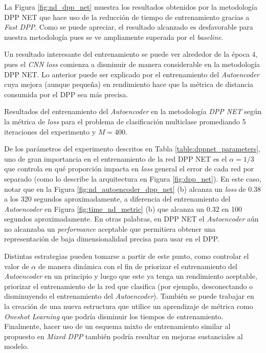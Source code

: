 La Figura \ref{fig:nd_dpp_net} muestra los resultados obtenidos por la metodología DPP NET que hace uso de la reducción de tiempo de entrenamiento gracias a \textit{Fast DPP}. Como se puede apreciar, el resultado alcanzado es desfavorable para nuestra metodología pues se ve ampliamente superada por el \textit{baseline}. 

\vspace{0.2cm}

Un resultado interesante del entrenamiento se puede ver alrededor de la época 4, pues el \textit{CNN loss} comienza a disminuir de manera considerable en la metodología DPP NET. Lo anterior puede ser explicado por el entrenamiento del \textit{Autoencoder} cuya mejora (aunque pequeña) en rendimiento hace que la métrica de distancia consumida por el DPP sea más precisa. 

\begin{images}[\label{fig:nd_autoencoder_dpp_net}]{\centering Resultados del entrenamiento del \textit{Autoencoder} en la metodología \textit{DPP NET} según la métrica de \textit{loss} para el problema de clasificación multiclase promediando 5 iteraciones del experimento y $M=400$.}
\end{images}

De los parámetros del experimento descritos en Tabla \ref{table:dppnet_parameters}, uno de gran importancia en el entrenamiento de la red DPP NET es el $\alpha = 1/3$ que controla en qué proporción impacta en \textit{loss} general el error de cada red por separado (como lo describe la arquitectura en Figura \ref{fig:dpp_net}). En este caso, notar que en la Figura \ref{fig:nd_autoencoder_dpp_net} (b) alcanza un \textit{loss} de 0.38 a los 320 segundos aproximadamente, a diferencia del entrenamiento del \textit{Autoencoder} en Figura \ref{fig:time_nd_metric} (b) que alcanza un 0.32 en 100 segundos aproximadamente. En otras palabras, en DPP NET el \textit{Autoencoder} aún no alcanzaba un \textit{performance} aceptable que permitiera obtener una representación de baja dimensionalidad precisa para usar en el DPP.

\vspace{0.2cm}

Distintas estrategias pueden tomarse a partir de este punto, como controlar el valor de $\alpha$ de manera dinámica con el fin de priorizar el entrenamiento del \textit{Autoencoder} en un principio y luego que este ya tenga un rendimiento aceptable, priorizar el entrenamiento de la red que clasifica (por ejemplo, desconectando o disminuyendo el entrenamiento del \textit{Autoencoder}). También se puede trabajar en la creación de una nueva estructura que utilice un aprendizaje de métrica como \textit{Oneshot Learning} que podría disminuir los tiempos de entrenamiento. Finalmente, hacer uso de un esquema mixto de entrenamiento similar al propuesto en \textit{Mixed DPP} también podría resultar en mejoras sustanciales al modelo. 


